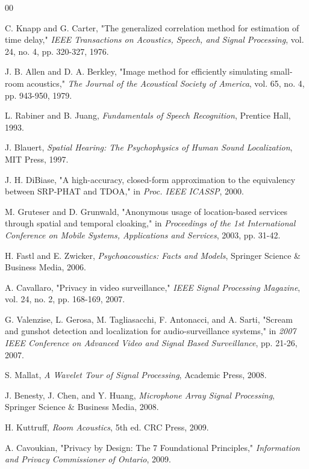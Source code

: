 \documentclass[conference]{IEEEtran}
\begin{document}
\begin{thebibliography}{00}

 C. Knapp and G. Carter, "The generalized correlation method for estimation of time delay," \textit{IEEE Transactions on Acoustics, Speech, and Signal Processing}, vol. 24, no. 4, pp. 320-327, 1976.

 J. B. Allen and D. A. Berkley, "Image method for efficiently simulating small-room acoustics," \textit{The Journal of the Acoustical Society of America}, vol. 65, no. 4, pp. 943-950, 1979.

 L. Rabiner and B. Juang, \textit{Fundamentals of Speech Recognition}, Prentice Hall, 1993.

 J. Blauert, \textit{Spatial Hearing: The Psychophysics of Human Sound Localization}, MIT Press, 1997.

 J. H. DiBiase, "A high-accuracy, closed-form approximation to the equivalency between SRP-PHAT and TDOA," in \textit{Proc. IEEE ICASSP}, 2000.

 M. Gruteser and D. Grunwald, "Anonymous usage of location-based services through spatial and temporal cloaking," in \textit{Proceedings of the 1st International Conference on Mobile Systems, Applications and Services}, 2003, pp. 31-42.

 H. Fastl and E. Zwicker, \textit{Psychoacoustics: Facts and Models}, Springer Science \& Business Media, 2006.

 A. Cavallaro, "Privacy in video surveillance," \textit{IEEE Signal Processing Magazine}, vol. 24, no. 2, pp. 168-169, 2007.

 G. Valenzise, L. Gerosa, M. Tagliasacchi, F. Antonacci, and A. Sarti, "Scream and gunshot detection and localization for audio-surveillance systems," in \textit{2007 IEEE Conference on Advanced Video and Signal Based Surveillance}, pp. 21-26, 2007.

 S. Mallat, \textit{A Wavelet Tour of Signal Processing}, Academic Press, 2008.

 J. Benesty, J. Chen, and Y. Huang, \textit{Microphone Array Signal Processing}, Springer Science \& Business Media, 2008.

 H. Kuttruff, \textit{Room Acoustics}, 5th ed. CRC Press, 2009.

 A. Cavoukian, "Privacy by Design: The 7 Foundational Principles," \textit{Information and Privacy Commissioner of Ontario}, 2009.


\end{thebibliography}
\end{document}
